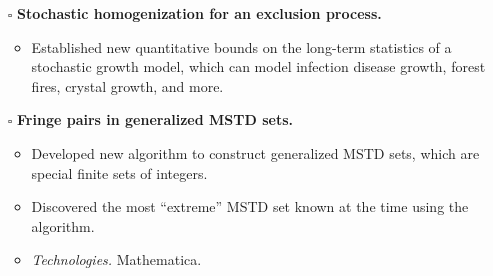 \documentclass{simplecv}
\begin{document}
\begin{itemize}
  \item[$\square$] {\bf Stochastic homogenization for an exclusion process.} 
  \begin{itemize}
    \item Established new quantitative bounds on the long-term statistics of a stochastic growth model, which can model infection disease growth, forest fires, crystal growth, and more. 
  \end{itemize}
  \item[$\square$] {\bf Fringe pairs in generalized MSTD sets.} 
  \begin{itemize}
    \item Developed new algorithm to construct generalized MSTD sets, which are special finite sets of integers. 
    \item Discovered the most ``extreme'' MSTD set known at the time using the algorithm.
    \item {\it Technologies.} Mathematica.
  \end{itemize}
\end{itemize}
\end{document}
